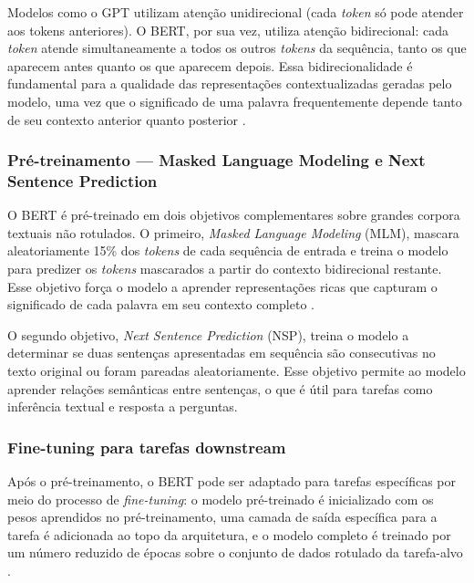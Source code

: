 \documentclass[
    12pt,                %
    openright,           %
    oneside,             %
    a4paper,             %
    english,             %
    brazil               %
]{abntex2}
\begin{document}
Modelos como o GPT utilizam atenção unidirecional (cada \textit{token} só pode atender aos tokens anteriores). O BERT, por sua vez, utiliza atenção bidirecional: cada \textit{token} atende simultaneamente a todos os outros \textit{tokens} da sequência, tanto os que aparecem antes quanto os que aparecem depois. Essa bidirecionalidade é fundamental para a qualidade das representações contextualizadas geradas pelo modelo, uma vez que o significado de uma palavra frequentemente depende tanto de seu contexto anterior quanto posterior \cite{devlin2019}.

\subsubsection{Pré-treinamento — Masked Language Modeling e Next Sentence Prediction}
\label{subsubsec:bert_pretrain}

O BERT é pré-treinado em dois objetivos complementares sobre grandes corpora textuais não rotulados. O primeiro, \textit{Masked Language Modeling} (MLM), mascara aleatoriamente 15\% dos \textit{tokens} de cada sequência de entrada e treina o modelo para predizer os \textit{tokens} mascarados a partir do contexto bidirecional restante. Esse objetivo força o modelo a aprender representações ricas que capturam o significado de cada palavra em seu contexto completo \cite{devlin2019}.

O segundo objetivo, \textit{Next Sentence Prediction} (NSP), treina o modelo a determinar se duas sentenças apresentadas em sequência são consecutivas no texto original ou foram pareadas aleatoriamente. Esse objetivo permite ao modelo aprender relações semânticas entre sentenças, o que é útil para tarefas como inferência textual e resposta a perguntas.

\subsubsection{Fine-tuning para tarefas downstream}
\label{subsubsec:bert_finetune}

Após o pré-treinamento, o BERT pode ser adaptado para tarefas específicas por meio do processo de \textit{fine-tuning}: o modelo pré-treinado é inicializado com os pesos aprendidos no pré-treinamento, uma camada de saída específica para a tarefa é adicionada ao topo da arquitetura, e o modelo completo é treinado por um número reduzido de épocas sobre o conjunto de dados rotulado da tarefa-alvo \cite{devlin2019}.
\end{document}
